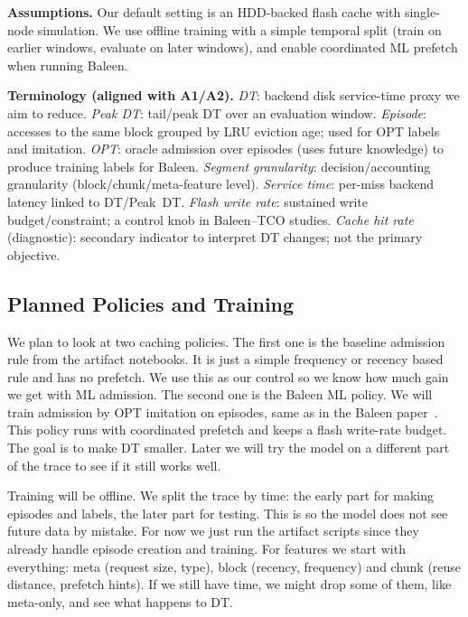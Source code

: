 \textbf{Assumptions.}
Our default setting is an HDD-backed flash cache with single-node simulation. We use offline training with a simple temporal split (train on earlier windows, evaluate on later windows), and enable coordinated ML prefetch when running Baleen.

\textbf{Terminology (aligned with A1/A2).}
\emph{DT}: backend disk service-time proxy we aim to reduce.
\emph{Peak DT}: tail/peak DT over an evaluation window.
\emph{Episode}: accesses to the same block grouped by LRU eviction age; used for OPT labels and imitation.
\emph{OPT}: oracle admission over episodes (uses future knowledge) to produce training labels for Baleen.
\emph{Segment granularity}: decision/accounting granularity (block/chunk/meta-feature level).
\emph{Service time}: per-miss backend latency linked to DT/Peak~DT.
\emph{Flash write rate}: sustained write budget/constraint; a control knob in Baleen--TCO studies.
\emph{Cache hit rate} (diagnostic): secondary indicator to interpret DT changes; not the primary objective.






\subsection{Planned Policies and Training}

We plan to look at two caching policies. The first one is the baseline
admission rule from the artifact notebooks. It is just a simple
frequency or recency based rule and has no prefetch. We use this as
our control so we know how much gain we get with ML admission.
The second one is the Baleen ML policy. We will train admission by
OPT imitation on episodes, same as in the Baleen paper~\cite{wong2024baleen}. This policy runs with coordinated prefetch and keeps a flash write-rate budget. The goal is to make DT smaller. Later we will try the model on a different part of the trace to see if it still works well.

Training will be offline. We split the trace by time: the early part for
making episodes and labels, the later part for testing. This is so the model does not see future data by mistake. For now we just run the artifact scripts since they already handle episode creation and training. For features we start with everything: meta (request size, type),
block (recency, frequency) and chunk (reuse distance, prefetch
hints). If we still have time, we might drop some of them, like meta-only, and see what happens to DT.

